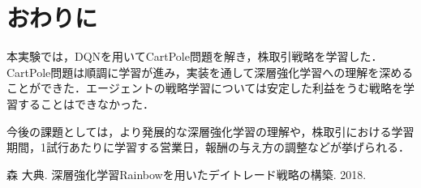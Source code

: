 \documentclass[twocolumn]{jarticle}
\begin{document}
\section{おわりに}
本実験では，DQNを用いてCartPole問題を解き，株取引戦略を学習した．CartPole問題は順調に学習が進み，実装を通して深層強化学習への理解を深めることができた．エージェントの戦略学習については安定した利益をうむ戦略を学習することはできなかった．

今後の課題としては，より発展的な深層強化学習の理解や，株取引における学習期間，1試行あたりに学習する営業日，報酬の与え方の調整などが挙げられる．

\begin{thebibliography}{9}
     森 大典. 深層強化学習Rainbowを用いたデイトレード戦略の構築. 2018.
\end{thebibliography}
\end{document}
